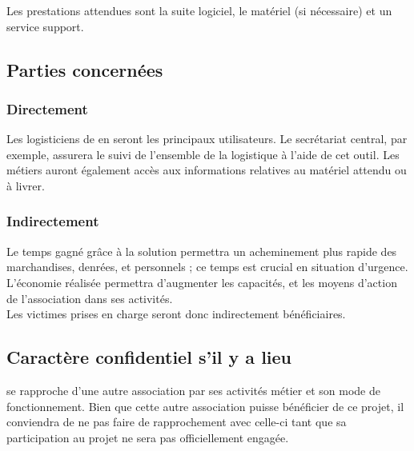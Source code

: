 Les prestations attendues sont la suite logiciel, le matériel (si nécessaire) et un service support.

\subsection{Parties concernées}

\subsubsection{Directement}
Les logisticiens de \mo en seront les principaux utilisateurs. Le secrétariat central, par exemple, assurera le suivi de l'ensemble de la logistique à l'aide de cet outil.
Les métiers auront également accès aux informations relatives au matériel attendu ou à livrer.

\subsubsection{Indirectement}
Le temps gagné grâce à la solution permettra un acheminement plus rapide des marchandises, denrées, et personnels ; ce temps est crucial en situation d'urgence. L'économie réalisée permettra d'augmenter les capacités, et les moyens d'action de l'association dans ses activités.
\\
Les victimes prises en charge seront donc indirectement bénéficiaires.


\subsection{Caractère confidentiel s'il y a lieu}
\mo se rapproche d'une autre association par ses activités métier et son mode de fonctionnement. Bien que cette autre association puisse bénéficier de ce projet, il conviendra de ne pas faire de rapprochement avec celle-ci tant que sa participation au projet ne sera pas officiellement engagée.

